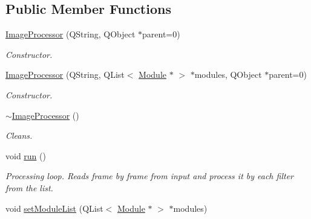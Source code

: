 \subsection*{Public Member Functions}
\begin{DoxyCompactItemize}
\item 
\hyperlink{class_image_processor_a4ad6c2b89340ebfbaf3cabb999fa5338}{ImageProcessor} (QString, QObject $\ast$parent=0)
\begin{DoxyCompactList}\small\item\em Constructor. \item\end{DoxyCompactList}\item 
\hyperlink{class_image_processor_a881e0bba87130ef44fb6abeef830414e}{ImageProcessor} (QString, QList$<$ \hyperlink{class_module}{Module} $\ast$ $>$ $\ast$modules, QObject $\ast$parent=0)
\begin{DoxyCompactList}\small\item\em Constructor. \item\end{DoxyCompactList}\item 
\hypertarget{class_image_processor_a2ff83cf5f0986ed04b7799499fe0defc}{
\hyperlink{class_image_processor_a2ff83cf5f0986ed04b7799499fe0defc}{$\sim$ImageProcessor} ()}
\label{de/d7d/class_image_processor_a2ff83cf5f0986ed04b7799499fe0defc}

\begin{DoxyCompactList}\small\item\em Cleans. \item\end{DoxyCompactList}\item 
\hypertarget{class_image_processor_a2f7b0040d90bda19ae2f0393fbe59abd}{
void \hyperlink{class_image_processor_a2f7b0040d90bda19ae2f0393fbe59abd}{run} ()}
\label{de/d7d/class_image_processor_a2f7b0040d90bda19ae2f0393fbe59abd}

\begin{DoxyCompactList}\small\item\em Processing loop. Reads frame by frame from input and process it by each filter from the list. \item\end{DoxyCompactList}\item 
\hypertarget{class_image_processor_a1b0cb82d35114ea1d9a4f7a0965fa285}{
void \hyperlink{class_image_processor_a1b0cb82d35114ea1d9a4f7a0965fa285}{setModuleList} (QList$<$ \hyperlink{class_module}{Module} $\ast$ $>$ $\ast$modules)}
\label{de/d7d/class_image_processor_a1b0cb82d35114ea1d9a4f7a0965fa285}


\end{DoxyCompactItemize}
